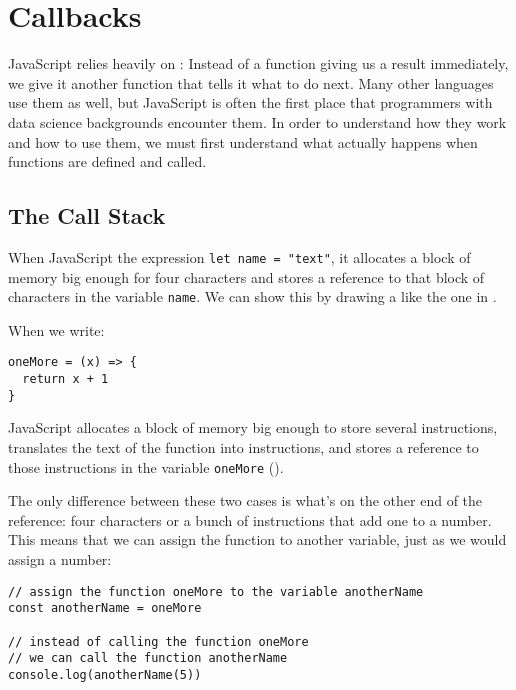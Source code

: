 \chapter{Callbacks}\label{s:callbacks}

JavaScript relies heavily on :
Instead of a function giving us a result immediately,
we give it another function that tells it what to do next.
Many other languages use them as well,
but JavaScript is often the first place that programmers with data science backgrounds encounter them.
In order to understand how they work and how to use them,
we must first understand what actually happens when functions are defined and called.

\section{The Call Stack}\label{s:callbacks-callstack}

When JavaScript  the expression \texttt{let\ name\ =\ "text"},
it allocates a block of memory big enough for four characters
and stores a reference to that block of characters in the variable \texttt{name}.
We can show this by drawing a 
like the one in .


When we write:

\begin{verbatim}
oneMore = (x) => {
  return x + 1
}
\end{verbatim}

JavaScript allocates a block of memory big enough to store several instructions,
translates the text of the function into instructions,
and stores a reference to those instructions in the variable \texttt{oneMore}
().


The only difference between these two cases is what's on the other end of the reference:
four characters or a bunch of instructions that add one to a number.
This means that we can assign the function to another variable,
just as we would assign a number:

\begin{verbatim}
// assign the function oneMore to the variable anotherName 
const anotherName = oneMore

// instead of calling the function oneMore
// we can call the function anotherName
console.log(anotherName(5))
\end{verbatim}

